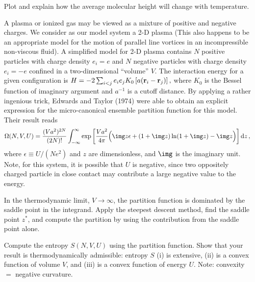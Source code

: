 \smallskip\subp
Plot and explain how the average molecular height will change with temperature.
    
    
    
\iffalse
\bigskip
{}
A plasma or ionized gas may be viewed as a mixture of positive and negative charges.
We consider as our model system a 2-D plasma
(This also happens to be an appropriate model for the motion of
parallel line vortices in an incompressible non-viscous fluid).
A simplified model for 2-D plasma contains
$N$ positive particles with charge density $e_i=e$
and $N$ negative particles with charge density $e_i = -e$ confined in a
two-dimensional ``volume'' $V$. The interaction energy for a given configuration is
$ H = -2\sum_{i<j} e_i e_j K_0\left[a ({\bf r}_i - {\bf r}_j)\right] ,$
where $K_0$ is the Bessel function of imaginary argument
and $a^{-1}$ is a cutoff distance.
By applying a rather ingenious trick, Edwards and Taylor (1974) were able to
obtain an explicit expression for the micro-canonical ensemble
partition function for this model.
Their result reads
$$ \Omega(N, V, U) = \frac{(Va^2)^{2N}}{(2N)!} \int_{-\infty}^{\infty} 
\exp\left[\frac{Va^2}{4\pi} \Big(\img z\epsilon + (1+\img z)\ln(1 + \img z) - \img z\Big) \right] {\rm d}z\,,$$
where $\epsilon \equiv U/(Ne^2)$ and $z$ are dimensionless,
and $\img$ is the imaginary unit.
Note, for this system, it is possible that $U$ is negative,
since two oppositely charged particle in close contact may contribute
a large negative value to the energy.

\smallskip\subp
In the thermodynamic limit, $V \to \infty$,
the partition function is dominated by the saddle point in the integrand.
Apply the steepest descent method, find the saddle point $z^*$,
and compute the partition by using the contribution from the saddle point alone.

\smallskip\subp
Compute the entropy $S(N,V,U)$ using the partition function.
Show that your result is thermodynamically admissible:
entropy $S$ (i) is extensive,
(ii) is a convex function of volume $V$,
and (iii) is a convex function of energy $U$.
Note: convexity $=$ negative curvature.

